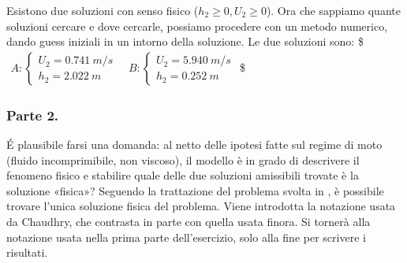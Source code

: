 \documentclass[letterpaper,10pt,italian]{jupyterBook}
\begin{document}
\sphinxAtStartPar
Esistono due soluzioni con senso fisico (\(h_2 \ge 0, U_2 \ge 0\)). Ora
che sappiamo quante soluzioni cercare e dove cercarle, possiamo
procedere con un metodo numerico, dando guess iniziali in un intorno
della soluzione. Le due soluzioni sono: \$\(\begin{aligned}
  A :
  \begin{cases}
   U_2 = 0.741 \ m/s \\
   h_2 = 2.022 \ m
  \end{cases}
   \quad
  B :
  \begin{cases}
   U_2 = 5.940 \ m/s \\
   h_2 = 0.252 \ m
  \end{cases}
\end{aligned}\)\$


\subsubsection{Parte 2.}
\label{\detokenize{polimi/fluidmechanics-ita/template/capitoli/05_bernoulli/0502in:parte-2}}
\sphinxAtStartPar
É plausibile farsi una domanda: al netto delle ipotesi fatte sul regime
di moto (fluido incomprimibile, non viscoso), il modello è in grado di
descrivere il fenomeno fisico e stabilire quale delle due soluzioni
amissibili trovate è la soluzione «fisica»? Seguendo la trattazione del
problema svolta in ,
è possibile trovare l’unica soluzione fisica del problema. Viene
introdotta la notazione usata da Chaudhry, che contrasta in parte con
quella usata finora. Si tornerà alla notazione usata nella prima parte
dell’esercizio, solo alla fine per scrivere i risultati.
\end{document}
